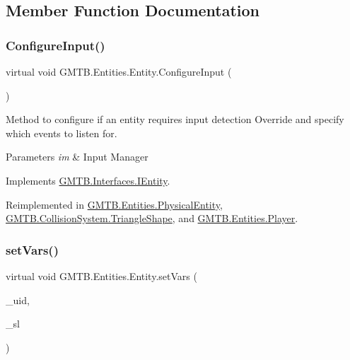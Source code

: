 \subsection{Member Function Documentation}
\mbox{\label{class_g_m_t_b_1_1_entities_1_1_entity_a73f4529a619029861fe443f95d13455c}} 
\subsubsection{\texorpdfstring{ConfigureInput()}{ConfigureInput()}}
{\footnotesize\ttfamily virtual void G\+M\+T\+B.\+Entities.\+Entity.\+Configure\+Input (\begin{DoxyParamCaption}{ }\end{DoxyParamCaption})\hspace{0.3cm}{\ttfamily [virtual]}}



Method to configure if an entity requires input detection Override and specify which events to listen for. 


\begin{DoxyParams}{Parameters}
{\em im} & Input Manager \\
\hline
\end{DoxyParams}


Implements \mbox{\hyperlink{interface_g_m_t_b_1_1_interfaces_1_1_i_entity}{G\+M\+T\+B.\+Interfaces.\+I\+Entity}}.



Reimplemented in \mbox{\hyperlink{class_g_m_t_b_1_1_entities_1_1_physical_entity_ac8ffd1ce4e40a17980f70b97e941451c}{G\+M\+T\+B.\+Entities.\+Physical\+Entity}}, \mbox{\hyperlink{class_g_m_t_b_1_1_collision_system_1_1_triangle_shape_a418c3ebbaa4187f74e922ccbea1520ef}{G\+M\+T\+B.\+Collision\+System.\+Triangle\+Shape}}, and \mbox{\hyperlink{class_g_m_t_b_1_1_entities_1_1_player_af7c91590f66efe071a0dec4853c30265}{G\+M\+T\+B.\+Entities.\+Player}}.

\mbox{\label{class_g_m_t_b_1_1_entities_1_1_entity_ae6d69c22b16436ec6df3b79099e1e81b}} 
\subsubsection{\texorpdfstring{setVars()}{setVars()}}
{\footnotesize\ttfamily virtual void G\+M\+T\+B.\+Entities.\+Entity.\+set\+Vars (\begin{DoxyParamCaption}\item[{int}]{\+\_\+uid,  }\item[{\mbox{\hyperlink{interface_g_m_t_b_1_1_interfaces_1_1_i_service_locator}{I\+Service\+Locator}}}]{\+\_\+sl }\end{DoxyParamCaption})\hspace{0.3cm}{\ttfamily [virtual]}}



